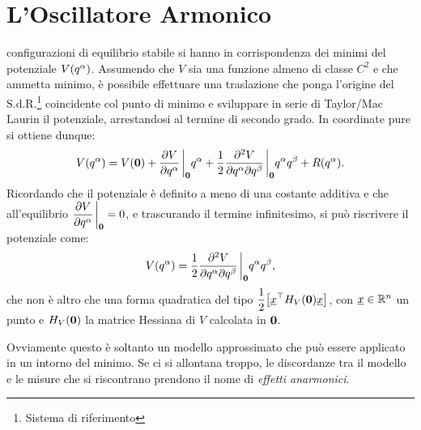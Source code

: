\chapter{L'Oscillatore Armonico}
configurazioni di equilibrio stabile si hanno in corrispondenza dei minimi del potenziale $V\qty(q^\alpha)$. Assumendo che $V$ sia una funzione almeno di classe $C^2$ e che ammetta minimo, \`e possibile effettuare una traslazione che ponga l'origine del S.d.R.\footnote{Sistema di riferimento} coincidente col punto di minimo e sviluppare in serie di Taylor/Mac Laurin il potenziale, arrestandosi al termine di secondo grado. In coordinate pure si ottiene dunque: $$V\qty(q^\alpha)=V\qty(\vb{0})+\pdv{V}{q^\alpha}\eval_{\vb{0}}q^\alpha+\frac{1}{2}\pdv{V}{q^\alpha}{q^\beta}\eval_{\vb{0}}q^\alpha q^\beta+R\qty(q^\alpha).$$ Ricordando che il potenziale \`e definito a meno di una costante additiva e che all'equilibrio $\displaystyle\pdv{V}{q^\alpha}\eval_{\vb{0}}=0$, e trascurando il termine infinitesimo, si pu\`o riscrivere il potenziale come:
    \begin{equation}
        V\qty(q^\alpha)=\frac{1}{2}\pdv{V}{q^\alpha}{q^\beta}\eval_{\vb{0}}q^\alpha q^\beta,
        \label{eq:potenziale}
    \end{equation} che non \`e altro che una forma quadratica del tipo $\displaystyle\frac{1}{2}\qty[\underline{x}^\top H_V\qty(\vb{0})\underline{x}]$, con $\underline{x}\in\mathbb{R}^n$ un punto e $H_V\qty(\vb{0})$ la matrice Hessiana di $V$ calcolata in $\vb{0}$. \par Ovviamente questo \`e soltanto un modello approssimato che pu\`o essere applicato in un intorno del minimo. Se ci si allontana troppo, le discordanze tra il modello e le misure che si riscontrano prendono il nome di \emph{effetti anarmonici}.
